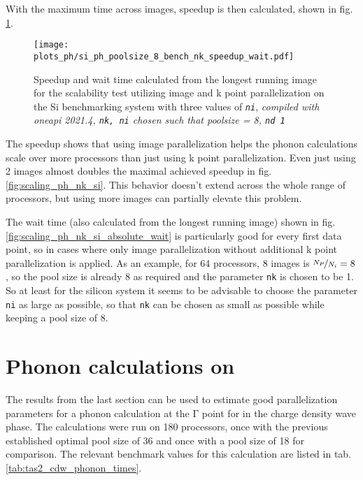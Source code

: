 \documentclass[main.tex]{subfiles}
\begin{document}
With the maximum time across images, speedup is then calculated, shown in fig. \ref{fig:scaling_ph_ni_poolsize_8_si}.

\begin{figure}[htb!]
    \centering
    \texttt{[image: plots\_ph/si\_ph\_poolsize\_8\_bench\_nk\_speedup\_wait.pdf]}
    \caption{Speedup and wait time calculated from the longest running image for the scalability test utilizing image and k point parallelization on the Si benchmarking system with three values of \emph{\texttt{ni}}, \emph{\QE compiled with \gls{oneapi} 2021.4, \texttt{nk, ni} chosen such that poolsize = 8, \texttt{nd 1}}}
    \label{fig:scaling_ph_ni_poolsize_8_si}
\end{figure}
The speedup shows that using image parallelization helps the phonon calculations scale over more processors than just using k point parallelization.
Even just using 2 images almost doubles the maximal achieved speedup in fig. \ref{fig:scaling_ph_nk_si}.
This behavior doesn't extend across the whole range of processors, but using more images can partially elevate this problem.

The wait time (also calculated from the longest running image) shown in fig. \ref{fig:scaling_ph_nk_si_absolute_wait} is particularly good for every first data point, so in cases where only image parallelization without additional k point parallelization is applied.
As an example, for 64 processors, 8 images is \(\nicefrac{N_P}{N_i} = 8\), so the pool size is already 8 as required and the parameter \texttt{nk} is chosen to be 1.
So at least for the silicon system it seems to be advisable to choose the parameter \texttt{ni} as large as possible, so that \texttt{nk} can be chosen as small as possible while keeping a pool size of 8.

\section{Phonon calculations on \TaS}\label{sec:phonon_tas2}

The results from the last section can be used to estimate good parallelization parameters for a phonon calculation at the \(\mathrm{\Gamma}\) point for \TaS in the charge density wave phase.
The calculations were run on 180 processors, once with the previous established optimal pool size of 36 and once with a pool size of 18 for comparison.
The relevant benchmark values for this calculation are listed in tab. \ref{tab:tas2_cdw_phonon_times}.
\end{document}
